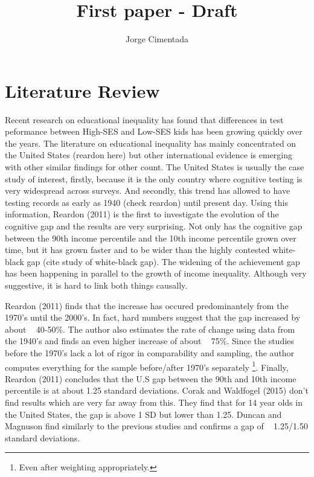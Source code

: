 \documentclass[11pt, a4paper]{article}\usepackage[]{graphicx}\usepackage[]{color}
\title{First paper - Draft}
\author{Jorge Cimentada}
\begin{document}
\setlength{\parindent}{2em}
\setlength{\parskip}{1em}

\maketitle





\tableofcontents












\section{Literature Review}

Recent research on educational inequality has found that differences in test peformance between High-SES and Low-SES kids has been growing quickly over the years. The literature on educational inequality has mainly concentrated on the United States (reardon here) but other international evidence is emerging with other similar findings for other count. The United States is usually the case study of interest, firstly, because it is the only country where cognitive testing is very widespread across surveys. And secondly, this trend has allowed to have testing records as early as 1940 (check reardon) until present day. Using this information, Reardon (2011) is the first to investigate the evolution of the cognitive gap and the results are very surprising. Not only has the cognitive gap between the 90th income percentile and the 10th income percentile grown over time, but it has grown faster and to be wider than the highly contested white-black gap (cite study of white-black gap). The widening of the achievement gap has been happening in parallel to the growth of income inequality. Although very suggestive, it is hard to link both things causally.

Reardon (2011) finds that the increase has occured predominantely from the 1970's until the 2000's. In fact, hard numbers suggest that the gap increased by about ~ 40-50\%. The author also estimates the rate of change using data from the 1940's and finds an even higher increase of about ~ 75\%. Since the studies before the 1970's lack a lot of rigor in comparability and sampling, the author computes everything for the sample before/after 1970's separately \footnote{Even after weighting appropriately.}. Finally, Reardon (2011) concludes that the U.S gap between the 90th and 10th income percentile is at about 1.25 standard deviations. Corak and Waldfogel (2015) don't find results which are very far away from this. They find that for 14 year olds in the United States, the gap is above 1 SD but lower than 1.25. Duncan and Magnuson find similarly to the previous studies and confirms a gap of ~ 1.25/1.50 standard deviations.
\end{document}

